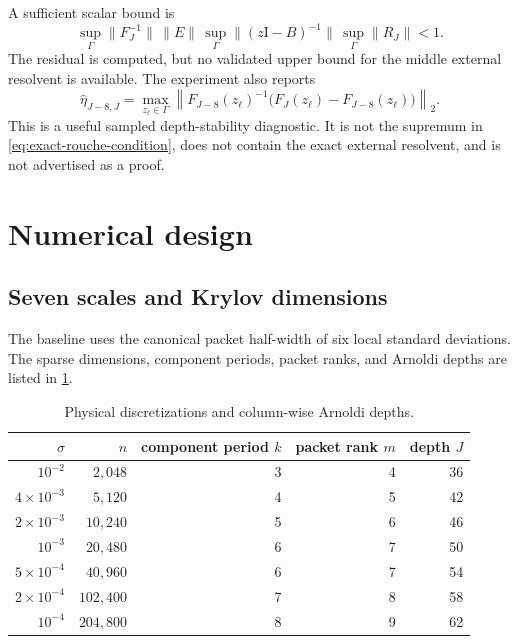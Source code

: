 \documentclass[11pt]{article}
\theoremstyle{definition}
\theoremstyle{remark}
\newcommand{\Id}{\mathrm I}
\begin{document}
A sufficient scalar bound is
\begin{equation}
 \sup_\Gamma\|F_J^{-1}\|\,\|E\|\,
 \sup_\Gamma\|(z\Id-B)^{-1}\|\,
 \sup_\Gamma\|R_J\|<1.
 \label{eq:scalar-rouche-bound}
\end{equation}
The residual is computed, but no validated upper bound for the middle
external resolvent is available.  The experiment also reports
\begin{equation}
 \widehat\eta_{J-8,J}
 =\max_{z_\ell\in\Gamma}
 \left\|F_{J-8}(z_\ell)^{-1}
       \bigl(F_J(z_\ell)-F_{J-8}(z_\ell)\bigr)\right\|_2.
 \label{eq:sampled-rouche}
\end{equation}
This is a useful sampled depth-stability diagnostic.  It is not the
supremum in \cref{eq:exact-rouche-condition}, does not contain the exact
external resolvent, and is not advertised as a proof.

\section{Numerical design}
\label{sec:numerics}

\subsection{Seven scales and Krylov dimensions}

The baseline uses the canonical packet half-width of six local standard
deviations.  The sparse dimensions, component periods, packet ranks, and
Arnoldi depths are listed in \cref{tab:settings}.

\begin{table}[H]
\centering
\caption{Physical discretizations and column-wise Arnoldi depths.}
\label{tab:settings}
\begin{tabular}{rrrrr}
\toprule
$\sigma$ & $n$ & component period $k$ & packet rank $m$ & depth $J$\\
\midrule
$10^{-2}$        & $2{,}048$   & 3 & 4 & 36\\
$4\times10^{-3}$ & $5{,}120$   & 4 & 5 & 42\\
$2\times10^{-3}$ & $10{,}240$  & 5 & 6 & 46\\
$10^{-3}$        & $20{,}480$  & 6 & 7 & 50\\
$5\times10^{-4}$ & $40{,}960$  & 6 & 7 & 54\\
$2\times10^{-4}$ & $102{,}400$ & 7 & 8 & 58\\
$10^{-4}$        & $204{,}800$ & 8 & 9 & 62\\
\bottomrule
\end{tabular}
\end{table}
\end{document}
